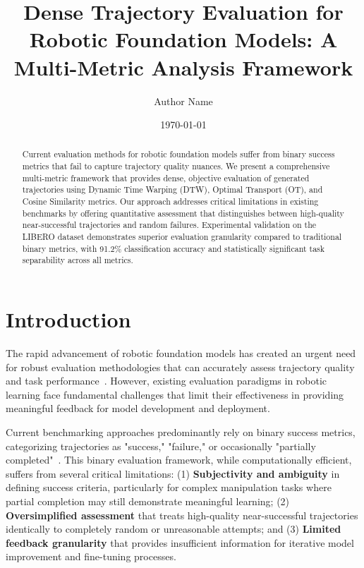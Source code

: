 \documentclass[10pt,twocolumn]{article}
\title{Dense Trajectory Evaluation for Robotic Foundation Models: A Multi-Metric Analysis Framework}
\author{Author Name}
\date{\today}
\begin{document}
\maketitle

\begin{abstract}
Current evaluation methods for robotic foundation models suffer from binary success metrics that fail to capture trajectory quality nuances. We present a comprehensive multi-metric framework that provides dense, objective evaluation of generated trajectories using Dynamic Time Warping (DTW), Optimal Transport (OT), and Cosine Similarity metrics. Our approach addresses critical limitations in existing benchmarks by offering quantitative assessment that distinguishes between high-quality near-successful trajectories and random failures. Experimental validation on the LIBERO dataset demonstrates superior evaluation granularity compared to traditional binary metrics, with 91.2\% classification accuracy and statistically significant task separability across all metrics.
\end{abstract}

\section{Introduction}

The rapid advancement of robotic foundation models has created an urgent need for robust evaluation methodologies that can accurately assess trajectory quality and task performance~\cite{brohan2023rt, driess2023palm}. However, existing evaluation paradigms in robotic learning face fundamental challenges that limit their effectiveness in providing meaningful feedback for model development and deployment.

Current benchmarking approaches predominantly rely on binary success metrics, categorizing trajectories as "success," "failure," or occasionally "partially completed"~\cite{yu2023language, shridhar2022cliport}. This binary evaluation framework, while computationally efficient, suffers from several critical limitations: (1) \textbf{Subjectivity and ambiguity} in defining success criteria, particularly for complex manipulation tasks where partial completion may still demonstrate meaningful learning; (2) \textbf{Oversimplified assessment} that treats high-quality near-successful trajectories identically to completely random or unreasonable attempts; and (3) \textbf{Limited feedback granularity} that provides insufficient information for iterative model improvement and fine-tuning processes.
\end{document}
